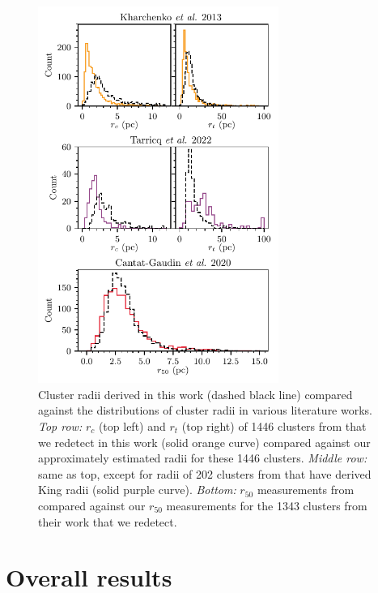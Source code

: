 \begin{figure}[p]
   \centering
   \includegraphics[width=0.7\textwidth]{fig/c3/fig_results_radii.pdf}
   \caption[Cluster radii derived in this work compared against the distributions of cluster radii in various literature works]{Cluster radii derived in this work (dashed black line) compared against the distributions of cluster radii in various literature works. \emph{Top row:} $r_c$ (top left) and $r_t$ (top right) of 1446 clusters from \cite{kharchenko_global_2013} that we redetect in this work (solid orange curve) compared against our approximately estimated \cite{king_structure_star_1962} radii for these 1446 clusters. \emph{Middle row:} same as top, except for radii of 202 clusters from \cite{tarricq_structural_2022} that have derived King radii (solid purple curve). \emph{Bottom:} $r_{50}$ measurements from \cite{cantat-gaudin_clusters_2020} compared against our $r_{50}$ measurements for the 1343 clusters from their work that we redetect.}%
   \label{c3:fig:radius_distributions}
\end{figure}

\section{Overall results}\label{c3:sec:results-overall}

